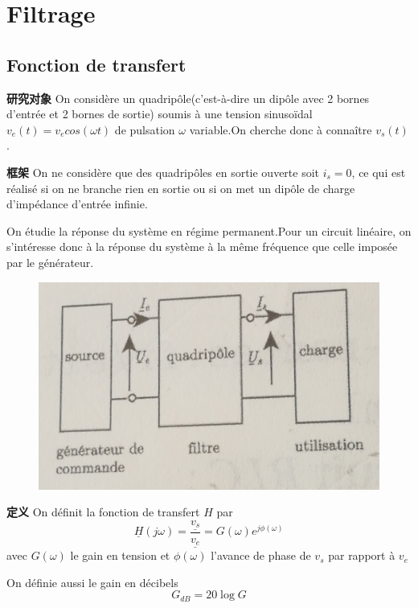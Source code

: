 \documentclass[12pt]{book}
\theoremstyle{definition}\newtheorem{dfn}{Définition}[chapter]
\theoremstyle{plain}\newtheorem{thm}{Théorème}[chapter]
\theoremstyle{plain}\newtheorem{prp}{Proposition}[chapter]
\theoremstyle{plain}\newtheorem{lem}{\bf Lemme}[chapter]
\theoremstyle{plain}\newtheorem{axm}{\bf Axiome}[chapter]
\theoremstyle{plain}\newtheorem{lmm}{\bf Lemme}[chapter]
\theoremstyle{plain}\newtheorem{cor}{\bf Corollaire}[chapter]
\theoremstyle{remark}\newtheorem{rem}{Remarque}[chapter]
\begin{document}
\chapter{Filtrage}
\section{Fonction de transfert}
\begin{framed}{\textbf{研究对象}}
On considère un quadripôle(c'est-à-dire un dipôle avec 2 bornes d'entrée et 2 bornes de sortie) soumis à une tension sinusoïdal $v_e(t)=v_e cos(\omega t)$ de pulsation $\omega$ variable.On cherche donc à connaître $v_s(t)$.
\end{framed}

\begin{framed}{\textbf{框架}}
	On ne considère que des quadripôles en sortie ouverte soit $i_s=0$, ce qui est réalisé si on ne branche rien en sortie ou si on met un dipôle de charge d'impédance d'entrée infinie.
	
	On étudie la réponse du système en régime permanent.Pour un circuit linéaire, on s'intéresse donc à la réponse du système à la même fréquence que celle imposée par le générateur.
\end{framed}

\begin{figure}[H]
	\centering
	\includegraphics[scale=0.08]{Filtrage//1}
\end{figure}


\begin{framed}{\textbf{定义}}
On définit la fonction de transfert $H$ par 
$$
\underline{H}(j\omega)=\frac{\underline{v_s}}{\underline{v_e}}=G(\omega)e^{j\phi(\omega)}
$$ 	
avec $G(\omega)$ le gain en tension et $\phi(\omega)$ l'avance de phase de $v_s$ par rapport à $v_e$

On définie aussi {\color{red}le gain en décibels}
$$
G_{dB}=20\log G
$$	
\end{framed}
\end{document}
